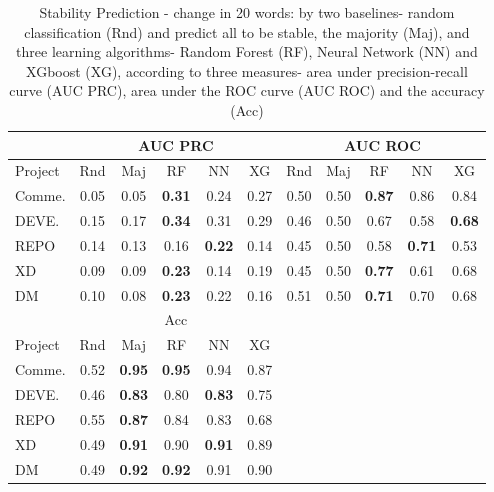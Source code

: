 \begin{table}[h]
	\centering
	\caption{Stability Prediction - change in 20 words:
	by two baselines- random classification (Rnd) and predict all to be stable, the majority (Maj), and three learning algorithms- Random Forest (RF), Neural Network (NN) and XGboost (XG), according to three measures- area under precision-recall curve (AUC PRC), area under the ROC curve (AUC ROC) and the accuracy (Acc)}		
    \begin{tabular}{|l|c|c|c|c|c|c|c|c|c|c|}
	 \hline
    {} &  \multicolumn{5}{|c|}{AUC PRC} & \multicolumn{5}{|c|}{AUC ROC}   \\
    \hline
	Project	&      Rnd & Maj &  RF   &  NN  &  XG  & Rnd  & Maj &  RF  &  NN  &  XG    \\
	\hline
	Comme.	&  0.05 & 0.05 & \textbf{0.31} & 0.24 & 0.27 & 0.50 & 0.50 & \textbf{0.87} & 0.86 & 0.84  \\
	DEVE.	&  0.15 & 0.17 & \textbf{0.34} & 0.31 & 0.29 & 0.46 & 0.50 & 0.67 & 0.58 & \textbf{0.68}  \\
	REPO	    &  0.14 & 0.13 & 0.16 & \textbf{0.22} & 0.14 & 0.45 & 0.50 & 0.58 & \textbf{0.71} & 0.53  \\
	XD	        &  0.09 & 0.09 & \textbf{0.23} & 0.14 & 0.19 & 0.45 & 0.50 & \textbf{0.77} & 0.61 & 0.68  \\
	DM	        &  0.10 & 0.08 & \textbf{0.23} & 0.22 & 0.16 & 0.51 & 0.50 & \textbf{0.71} & 0.70 & 0.68  \\
	
	\hline \hline
	{} &  \multicolumn{5}{|c|}{Acc}\\
	\cmidrule{1-6}
	Project	    &   Rnd & Maj &  RF  &  NN  & XG \\
	\cmidrule{1-6}
	Comme.	&   0.52 & \textbf{0.95} & \textbf{0.95} & 0.94 & 0.87 \\
	DEVE.	&   0.46 & \textbf{0.83} & 0.80 & \textbf{0.83} & 0.75 \\
	REPO	    &   0.55 & \textbf{0.87} & 0.84 & 0.83 & 0.68 \\
	XD	        &   0.49 & \textbf{0.91} & 0.90 & \textbf{0.91} & 0.89 \\
	DM	        &   0.49 & \textbf{0.92} & \textbf{0.92} & 0.91 & 0.90 \\
	\cmidrule{1-6}
    \end{tabular}
    \label{Table:prediction results 20}
\end{table}


